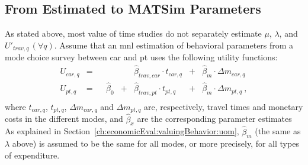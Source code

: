 

\subsection{From Estimated to MATSim Parameters}
\label{ch:economicEval:valuingBehavior:estimates2Matsim}

As stated above, most value of time studies do not separately estimate $\mu$, $\lambda$, and $U'_{trav,q} \, (\forall q)$. 
%
Assume that an \gls{mnl} estimation of behavioral parameters from a mode choice survey between car and \gls{pt} uses the following utility functions:
%
\begin{equation}
\begin{matrix}
U_{car,q} & =
&   &
&   & \hat{\beta}_{trav,car} \cdot t_{car,q}
& + & \hat{\beta}_{m} \cdot  \Delta{m_{car,q}} \\
%
U_{pt,q} & = 
&   & \hat{\beta}_{0}
& + & \hat{\beta}_{trav,pt} \cdot t_{pt,q}
& + & \hat{\beta}_{m} \cdot  \Delta{m_{pt,q}}  \ , \\
\end{matrix}
\label{eq:ch:economicEval:utilityTraveling}
\end{equation}
%
where $t_{car,q}$, $t_{pt,q}$, $\Delta{m_{car,q}}$ and $\Delta{m_{pt,q}}$  are, respectively, travel times and monetary costs in the different modes, and $\hat\beta_x$ are the corresponding parameter estimates
%
As explained in Section~\ref{ch:economicEval:valuingBehavior:uom}, $\hat\beta_m$ (the same as $\lambda$ above) is assumed to be the same for all modes, or more precisely, for all types of expenditure.

%
%
%

